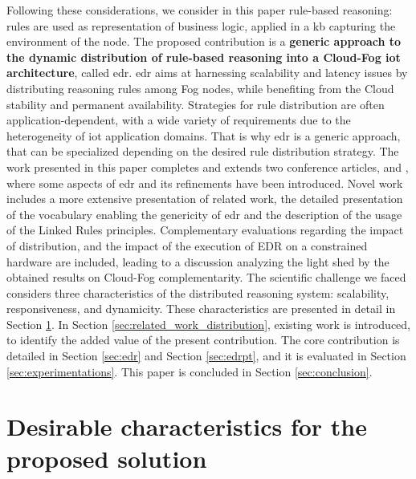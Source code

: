 \documentclass{iosart2c}
\newcommand{\edr}{EDR\xspace}
\begin{document}
Following these considerations, we consider in this paper rule-based reasoning: rules are used as representation of business logic, applied in a \gls{kb} capturing the environment of the node.
The proposed contribution is a \textbf{generic approach to the dynamic distribution of rule-based reasoning into a Cloud-Fog \gls{iot} architecture}, called \gls{edr}.
\gls{edr} aims at harnessing scalability and latency issues by distributing reasoning rules among Fog nodes, while benefiting from the Cloud stability and permanent availability. 
Strategies for rule distribution are often application-dependent, with a wide variety of requirements due to the heterogeneity of \gls{iot} application domains.
That is why \gls{edr} is a generic approach, that can be specialized depending on the desired rule distribution strategy.
The work presented in this paper completes and extends two conference articles, \cite{wi2018} and \cite{coopis2018}, where some aspects of \gls{edr} and its refinements have been introduced.
Novel work includes a more extensive presentation of related work, the detailed presentation of the vocabulary enabling the genericity of \gls{edr} and the description of the usage of the Linked Rules \cite{Khandelwal2011} principles. 
Complementary evaluations regarding the impact of distribution, and the impact of the execution of \edr on a constrained hardware are included, leading to a discussion analyzing the light shed by the obtained results on Cloud-Fog complementarity. 
The scientific challenge we faced considers three characteristics of the distributed reasoning system: scalability, responsiveness, and dynamicity. 
These characteristics are presented in detail in Section \textsection \ref{sec:edr_characteristics}.
In Section \textsection \ref{sec:related_work_distribution}, existing work is introduced, to identify the added value of the present contribution.
The core contribution is detailed in Section \textsection \ref{sec:edr} and Section \textsection \ref{sec:edrpt}, and it is evaluated in Section \textsection \ref{sec:experimentations}.
This paper is concluded in Section \textsection \ref{sec:conclusion}.

\section{Desirable characteristics for the proposed solution}
\label{sec:edr_characteristics}
\end{document}
